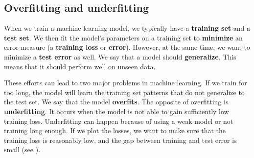 

    \subsection{Overfitting and underfitting}

    When we train a machine learning model, we typically have a
    \textbf{training set} and a \textbf{test set}. We then fit the model's
    parameters on a training set to \textbf{minimize} an error measure
    (a \textbf{training loss} or \textbf{error}). However, at the same time, we want
    to minimize a \textbf{test error} as well. We say that a model should
    \textbf{generalize}. This means that it should perform well on unseen data.

    These efforts can lead to two major problems in machine learning. If we train
    for too long, the model will learn the training set patterns that do not
    generalize to the test set. We say that the model \textbf{overfits}. The
    opposite of overfitting is \textbf{underfitting}. It occurs when the model is
    not able to gain sufficiently low training loss. Underfitting can happen because
    of using a weak model or not training long enough. If we plot the losses, we
    want to make sure that the training loss is reasonably low, and the gap between
    training and test error is small (see ).

